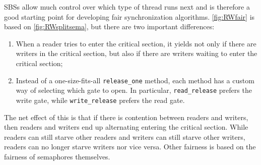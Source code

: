 \documentclass{report}
\newcommand{\harmonylink}[1]{%
[\href{https://harmony.cs.cornell.edu/#1}{\underline{#1}}]%
}
\newenvironment{code}{
\tcolorbox
}{
\endtcolorbox
}
\begin{document}
{SBSs allow much control over which type of thread runs next and is therefore
a good starting point for developing fair synchronization algorithms.
\autoref{fig:RWfair} is based on \autoref{fig:RWsplitsema}, but there
are two important differences:

\begin{enumerate}
\item When a reader tries to enter the critical section, it yields not only
if there are writers in the critical section, but also if there are writers
waiting to enter the critical section;
\item Instead of a one-size-fits-all \texttt{release\_one} method, each
method has a custom way of selecting which gate to open.  In particular,
\texttt{read\_release} prefers the write gate, while \texttt{write\_release}
prefers the read gate.
\end{enumerate}

The net effect of this is that if there is contention between readers and
writers, then readers and writers end up alternating entering the critical
section.  While readers can still starve other readers and writers can still
starve other writers, readers can no longer starve writers nor vice versa.
Other fairness is based on the fairness of semaphores themselves.

}
\end{document}
